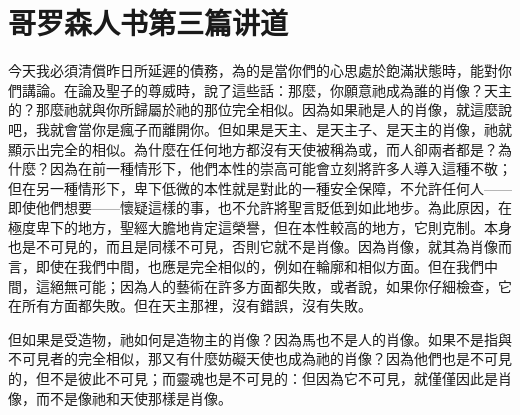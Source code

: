 

\section{哥罗森人书第三篇讲道}

\par

\par

今天我必須清償昨日所延遲的債務，為的是當你們的心思處於飽滿狀態時，能對你們講論。在論及聖子的尊威時，說了這些話：那麼，你願意祂成為誰的肖像？天主的？那麼祂就與你所歸屬於祂的那位完全相似。因為如果祂是人的肖像，就這麼說吧，我就會當你是瘋子而離開你。但如果是天主、是天主子、是天主的肖像，祂就顯示出完全的相似。為什麼在任何地方都沒有天使被稱為或，而人卻兩者都是？為什麼？因為在前一種情形下，他們本性的崇高可能會立刻將許多人導入這種不敬；但在另一種情形下，卑下低微的本性就是對此的一種安全保障，不允許任何人——即使他們想要——懷疑這樣的事，也不允許將聖言貶低到如此地步。為此原因，在極度卑下的地方，聖經大膽地肯定這榮譽，但在本性較高的地方，它則克制。本身也是不可見的，而且是同樣不可見，否則它就不是肖像。因為肖像，就其為肖像而言，即使在我們中間，也應是完全相似的，例如在輪廓和相似方面。但在我們中間，這絕無可能；因為人的藝術在許多方面都失敗，或者說，如果你仔細檢查，它在所有方面都失敗。但在天主那裡，沒有錯誤，沒有失敗。\par

但如果是受造物，祂如何是造物主的肖像？因為馬也不是人的肖像。如果不是指與不可見者的完全相似，那又有什麼妨礙天使也成為祂的肖像？因為他們也是不可見的，但不是彼此不可見；而靈魂也是不可見的：但因為它不可見，就僅僅因此是肖像，而不是像祂和天使那樣是肖像。\par

